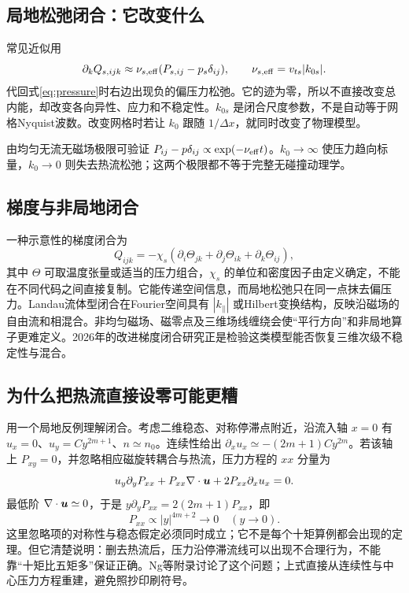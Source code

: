 \subsection{局地松弛闭合：它改变什么}
常见近似用
\begin{equation}\partial_kQ_{s,ijk}\approx\nu_{s,\rm eff}(P_{s,ij}-p_s\delta_{ij}),\qquad
\nu_{s,\rm eff}=v_{ts}|k_{0s}|.\label{eq:localclosure}
\end{equation}
代回式\eqref{eq:pressure}时右边出现负的偏压力松弛。它的迹为零，所以不直接改变总内能，却改变各向异性、应力和不稳定性。$k_{0s}$ 是闭合尺度参数，不是自动等于网格Nyquist波数。改变网格时若让 $k_0$ 跟随 $1/\Delta x$，就同时改变了物理模型。

由均匀无流无磁场极限可验证 $P_{ij}-p\delta_{ij}\propto\exp(-\nu_{\rm eff}t)$。$k_0\to\infty$ 使压力趋向标量，$k_0\to0$ 则失去热流松弛；这两个极限都不等于完整无碰撞动理学。

\subsection{梯度与非局地闭合}
一种示意性的梯度闭合为
\begin{equation}Q_{ijk}=-\chi_s\left(\partial_i\Theta_{jk}+\partial_j\Theta_{ik}+\partial_k\Theta_{ij}\right),
\end{equation}
其中 $\Theta$ 可取温度张量或适当的压力组合，$\chi_s$ 的单位和密度因子由定义确定，不能在不同代码之间直接复制。它能传递空间信息，而局地松弛只在同一点抹去偏压力。Landau流体型闭合在Fourier空间具有 $|k_\parallel|$ 或Hilbert变换结构，反映沿磁场的自由流和相混合。非均匀磁场、磁零点及三维场线缠绕会使“平行方向”和非局地算子更难定义。2026年的改进梯度闭合研究正是检验这类模型能否恢复三维次级不稳定性与混合。\citep{Closure2026}

\subsection{为什么把热流直接设零可能更糟}
用一个局地反例理解闭合。考虑二维稳态、对称停滞点附近，沿流入轴 $x=0$ 有 $u_x=0$、$u_y=C y^{2m+1}$、$n\simeq n_0$。连续性给出
$\partial_xu_x\simeq-(2m+1)Cy^{2m}$。若该轴上 $P_{xy}=0$，并忽略相应磁旋转耦合与热流，压力方程的 $xx$ 分量为
\begin{equation}
u_y\partial_yP_{xx}+P_{xx}\nabla\cdot\bm{u}+2P_{xx}\partial_xu_x=0.
\end{equation}
最低阶 $\nabla\cdot\bm{u}\simeq0$，于是
$y\partial_yP_{xx}=2(2m+1)P_{xx}$，即
\begin{equation}P_{xx}\propto |y|^{4m+2}\longrightarrow0\quad(y\to0).
\end{equation}
这里忽略项的对称性与稳态假定必须同时成立；它不是每个十矩算例都会出现的定理。但它清楚说明：删去热流后，压力沿停滞流线可以出现不合理行为，不能靠“十矩比五矩多”保证正确。Ng等附录讨论了这个问题；上式直接从连续性与中心压力方程重建，避免照抄印刷符号。\citep{Ng2020}

